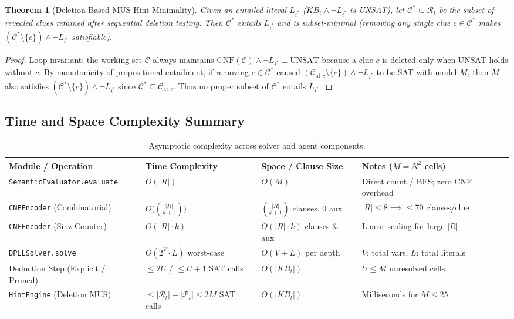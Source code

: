 \documentclass[11pt,a4paper]{article}
\newtheorem{theorem}{Theorem}[section]
\begin{document}
\begin{theorem}[Deletion-Based MUS Hint Minimality]
Given an entailed literal $L_{i^*}$ ($KB_t \land \neg L_{i^*}$ is UNSAT), let $\mathcal{C}^* \subseteq \mathcal{R}_t$ be the subset of revealed clues retained after sequential deletion testing. Then $\mathcal{C}^*$ entails $L_{i^*}$ and is subset-minimal (removing any single clue $c \in \mathcal{C}^*$ makes $(\mathcal{C}^* \setminus \{c\}) \land \neg L_{i^*}$ satisfiable).
\end{theorem}
\begin{proof}
Loop invariant: the working set $\mathcal{C}$ always maintains $\text{CNF}(\mathcal{C}) \land \neg L_{i^*} \equiv \text{UNSAT}$ because a clue $c$ is deleted only when UNSAT holds without $c$. By monotonicity of propositional entailment, if removing $c \in \mathcal{C}^*$ caused $(\mathcal{C}_{\text{at } c} \setminus \{c\}) \land \neg L_{i^*}$ to be SAT with model $M$, then $M$ also satisfies $(\mathcal{C}^* \setminus \{c\}) \land \neg L_{i^*}$ since $\mathcal{C}^* \subseteq \mathcal{C}_{\text{at } c}$. Thus no proper subset of $\mathcal{C}^*$ entails $L_{i^*}$.
\end{proof}

\subsection{Time and Space Complexity Summary}
\begin{table}[h!]
\centering
\small
\begin{tabular}{@{}llll@{}}
\toprule
\textbf{Module / Operation} & \textbf{Time Complexity} & \textbf{Space / Clause Size} & \textbf{Notes ($M = N^2$ cells)} \\
\midrule
\texttt{SemanticEvaluator.evaluate} & $O(|R|)$ & $O(M)$ & Direct count / BFS; zero CNF overhead \\
\texttt{CNFEncoder} (Combinatorial) & $O\big(\binom{|R|}{k+1}\big)$ & $\binom{|R|}{k+1}$ clauses, $0$ aux & $|R| \le 8 \implies \le 70$ clauses/clue \\
\texttt{CNFEncoder} (Sinz Counter) & $O(|R|\cdot k)$ & $O(|R|\cdot k)$ clauses \& aux & Linear scaling for large $|R|$ \\
\texttt{DPLLSolver.solve} & $O(2^V \cdot L)$ worst-case & $O(V + L)$ per depth & $V$: total vars, $L$: total literals \\
Deduction Step (Explicit / Pruned) & $\le 2U$ / $\le U+1$ SAT calls & $O(|KB_t|)$ & $U \le M$ unresolved cells \\
\texttt{HintEngine} (Deletion MUS) & $\le |\mathcal{R}_t| + |\mathcal{P}_t| \le 2M$ SAT calls & $O(|KB_t|)$ & Milliseconds for $M \le 25$ \\
\bottomrule
\end{tabular}
\caption{Asymptotic complexity across solver and agent components.}
\end{table}
\end{document}
